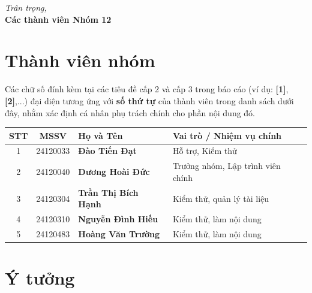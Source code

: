 \documentclass[12pt, a4paper]{article}
\begin{document}
\vspace{1.5cm}
\begin{flushright}
  \textit{Trân trọng,}\\
  \textbf{Các thành viên Nhóm 12}
\end{flushright}


\newpage
\renewcommand{\contentsname}{Mục lục}
\tableofcontents

\newpage
\section{Thành viên nhóm}

\begin{tcolorbox}[
    colback=blue!5!white,
    colframe=blue!75!black,
    title={\faInfoCircle\hspace{0.5em}Ghi chú},
    fonttitle=\bfseries,
    boxrule=1pt,
    arc=4pt,
    left=6pt, right=6pt, top=4pt, bottom=4pt
]
Các chữ số đính kèm tại các tiêu đề cấp 2 và cấp 3 trong báo cáo (ví dụ: \textbf{[1]}, \textbf{[2]},...) đại diện tương ứng với \textbf{số thứ tự} của thành viên trong danh sách dưới đây, nhằm xác định cá nhân phụ trách chính cho phần nội dung đó.
\end{tcolorbox}

\vspace{0.5cm}
\renewcommand{\arraystretch}{1.8}
\begin{table}[h!]
  \centering
  \begin{tabularx}{\textwidth}{@{} c c X X @{}}
    \toprule
    \textbf{STT} & \textbf{MSSV} & \textbf{Họ và Tên} & \textbf{Vai trò / Nhiệm vụ chính} \\
    \midrule
    1 & 24120033 & \textbf{Đào Tiến Đạt} & Hỗ trợ, Kiểm thử \\
    2 & 24120040 & \textbf{Dương Hoài Đức} & Trưởng nhóm, Lập trình viên chính \\
    3 & 24120304 & \textbf{Trần Thị Bích Hạnh} & Kiểm thử, quản lý tài liệu \\
    4 & 24120310 & \textbf{Nguyễn Đình Hiếu} & Kiểm thử, làm nội dung \\
    5 & 24120483 & \textbf{Hoàng Văn Trường} & Kiểm thử, làm nội dung \\
    \bottomrule
  \end{tabularx}
\end{table}


\newpage
\section{Ý tưởng}
\end{document}
